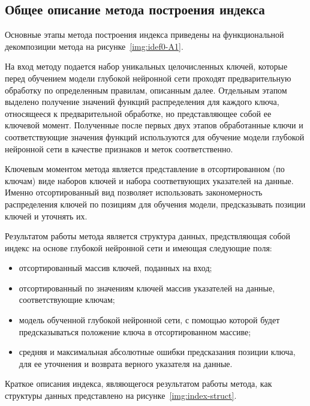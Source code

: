 \subsection{Общее описание метода построения индекса}

Основные этапы метода построения индекса приведены на функциональной
декомпозиции метода на рисунке~\ref{img:idef0-A1}. 


На вход методу подается набор уникальных целочисленных ключей, которые перед
обучением модели глубокой нейронной сети проходят предварительную обработку по
определенным правилам, описанным далее. Отдельным этапом выделено получение
значений функций распределения для каждого ключа, относящееся к предварительной
обработке, но представляющее собой ее ключевой момент. Полученные после первых
двух этапов обработанные ключи и соответствующие значения функций используются
для обучение модели глубокой нейронной сети в качестве признаков и меток
соответственно.

Ключевым моментом метода является представление в отсортированном (по ключам)
виде наборов ключей и набора соответвующих указателей на данные. Именно
отсортированный вид позволяет использовать закономерность распределения ключей
по позициям для обучения модели, предсказывать позиции ключей и уточнять их.

Результатом работы метода является структура данных, предствляющая собой индекс
на основе глубокой нейронной сети и имеющая следующие поля:

\begin{itemize}
    \item отсортированный массив ключей, поданных на вход;
    \item отсортированный по значениям ключей массив указателей
        на данные, соответствующие ключам;
    \item модель обученной глубокой нейронной сети, с помощью которой будет
        предсказываться положение ключа в отсортированном массиве;
    \item средняя и максимальная абсолютные ошибки предсказания позиции ключа,
        для ее уточнения и возврата верного указателя на данные.
\end{itemize}

Краткое описания индекса, являющегося результатом работы метода, как структуры
данных представлено на рисунке~\ref{img:index-struct}.


